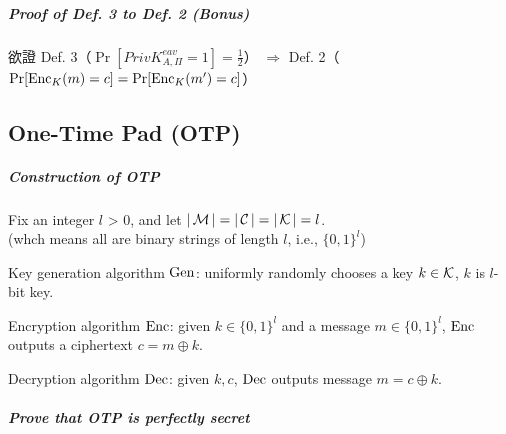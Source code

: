 \subparagraph{Proof of Def. 3 to Def. 2 (Bonus)}

欲證 Def. 3（\(\Pr[PrivK_{A, \Pi}^{eav} = 1] = \frac{1}{2}\)） \(\Rightarrow\) Def. 2（\(\Pr[\operatorname{Enc}_K(m) = c] = \Pr[\operatorname{Enc}_K(m') = c]\)）

\begin{myProof}
	
	\iffalse
	\begin{flalign*}
		\text{Let} & \Pr[\Enc_K(m) = c] \neq \Pr[\Enc_K(m') = c] && \\
		\Rightarrow & \Pr[\Enc_K(M) = c \mid M = m] \neq \Pr[\Enc_K(M) = c \mid M = m'] && \\
		\Rightarrow & \Pr[C = c \mid M = m] \neq \Pr[C = c \mid M = m'] && \\
		\Rightarrow & (\Pr[C = c \mid M = m] > \Pr[C = c \mid M = m']) \vee
			(\Pr[C = c \mid M = m] < \Pr[C = c \mid M = m']) && \\
		\Rightarrow & 
	\end{flalign*}
	\fi
\end{myProof}


\subsection{One-Time Pad (OTP)}

\subparagraph{Construction of OTP} \label{def:OTP}

Fix an integer \(l\) > 0, and let \(|\operatorname{\mathcal{M}}| = |\operatorname{\mathcal{C}}| = |\operatorname{\mathcal{K}}| = l\). \\
(whch means all are binary strings of length \(l\), i.e., \(\{0, 1\}^l\))

Key generation algorithm \(\operatorname{Gen}\): uniformly randomly chooses a key \(k \in \operatorname{\mathcal{K}}\), \(k\) is \(l\)-bit key.

Encryption algorithm \(\operatorname{Enc}\): given \(k \in \{0, 1\}^l\) and a message \(m \in \{0, 1\}^l\), \(\operatorname{Enc}\) outputs a ciphertext \(c = m \oplus k\).

Decryption algorithm \(\operatorname{Dec}\): given \(k, c\), \(\operatorname{Dec}\) outputs message \(m = c \oplus k\).

\subparagraph{Prove that OTP is perfectly secret}

